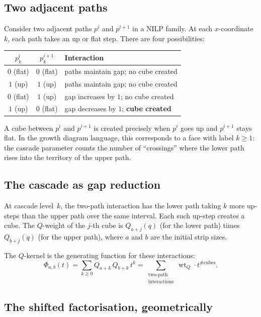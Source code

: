 \documentclass[11pt]{article}
\DeclareMathOperator{\wt}{wt}
\theoremstyle{plain}
\theoremstyle{definition}
\begin{document}
\subsection{Two adjacent paths}

Consider two adjacent paths $p^i$ and $p^{i+1}$ in a NILP
family.  At each $x$-coordinate~$k$, each path takes an up or
flat step.  There are four possibilities:
\begin{center}
\begin{tabular}{c|c|l}
$p^i_k$ & $p^{i+1}_k$ & \textbf{Interaction} \\ \hline
$0$ (flat) & $0$ (flat) &
  paths maintain gap; no cube created \\
$1$ (up) & $1$ (up) &
  paths maintain gap; no cube created \\
$0$ (flat) & $1$ (up) &
  gap increases by $1$; no cube created \\
$1$ (up) & $0$ (flat) &
  gap decreases by $1$; \textbf{cube created}
\end{tabular}
\end{center}

A cube between $p^i$ and $p^{i+1}$ is created precisely when
$p^i$ goes up and $p^{i+1}$ stays flat.  In the growth diagram
language, this corresponds to a face with label $k \geq 1$:
the cascade parameter counts the number of ``crossings''
where the lower path rises into the territory of the upper
path.


\subsection{The cascade as gap reduction}

At cascade level~$k$, the two-path interaction has the lower
path taking $k$ more up-steps than the upper path over the
same interval.  Each such up-step creates a cube.  The
$Q$-weight of the $j$-th cube is $Q_{a+j}(q)$ (for the lower
path) times $Q_{b+j}(q)$ (for the upper path), where $a$ and
$b$ are the initial strip sizes.

The $Q$-kernel is the generating function for these
interactions:
\begin{equation}\label{eq:Phi-NILP}
  \boxed{\;
  \Phi_{a,b}(t)
  = \sum_{k \geq 0} Q_{a+k}\, Q_{b+k}\, t^k
  = \sum_{\substack{\text{two-path} \\
    \text{interactions}}}
    \wt_Q \cdot t^{\#\text{cubes}}.
  \;}
\end{equation}


\subsection{The shifted factorisation, geometrically}
\end{document}
